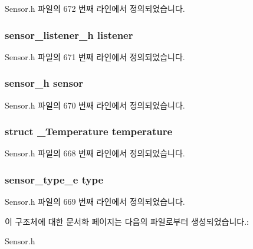 Sensor.\-h 파일의 672 번째 라인에서 정의되었습니다.

\hypertarget{struct__TemperatureExtend_aa977dfb866b24fd7d9a20a9a01b2fd1f}{
\subsubsection[{listener}]{\setlength{\rightskip}{0pt plus 5cm}sensor\-\_\-listener\-\_\-h listener}}\label{struct__TemperatureExtend_aa977dfb866b24fd7d9a20a9a01b2fd1f}


Sensor.\-h 파일의 671 번째 라인에서 정의되었습니다.

\hypertarget{struct__TemperatureExtend_a5bae9b7801bc3808411925cde81d3f26}{
\subsubsection[{sensor}]{\setlength{\rightskip}{0pt plus 5cm}sensor\-\_\-h sensor}}\label{struct__TemperatureExtend_a5bae9b7801bc3808411925cde81d3f26}


Sensor.\-h 파일의 670 번째 라인에서 정의되었습니다.

\hypertarget{struct__TemperatureExtend_ae174a42339036c716d64258eab61d521}{
\subsubsection[{temperature}]{\setlength{\rightskip}{0pt plus 5cm}struct {\bf \-\_\-\-Temperature} temperature}}\label{struct__TemperatureExtend_ae174a42339036c716d64258eab61d521}


Sensor.\-h 파일의 668 번째 라인에서 정의되었습니다.

\hypertarget{struct__TemperatureExtend_abffb09766da2fc510a79bb51f82a36e1}{
\subsubsection[{type}]{\setlength{\rightskip}{0pt plus 5cm}sensor\-\_\-type\-\_\-e type}}\label{struct__TemperatureExtend_abffb09766da2fc510a79bb51f82a36e1}


Sensor.\-h 파일의 669 번째 라인에서 정의되었습니다.



이 구조체에 대한 문서화 페이지는 다음의 파일로부터 생성되었습니다.\-:\begin{DoxyCompactItemize}
\item 
Sensor.\-h\end{DoxyCompactItemize}
